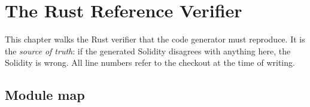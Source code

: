\chapter{The Rust Reference Verifier}
\label{ch:rust}

This chapter walks the Rust verifier that the code generator must reproduce.
It is the \emph{source of truth}: if the generated Solidity disagrees with
anything here, the Solidity is wrong. All line numbers refer to the checkout
at the time of writing.

\section{Module map}
\label{sec:rust-modules}


